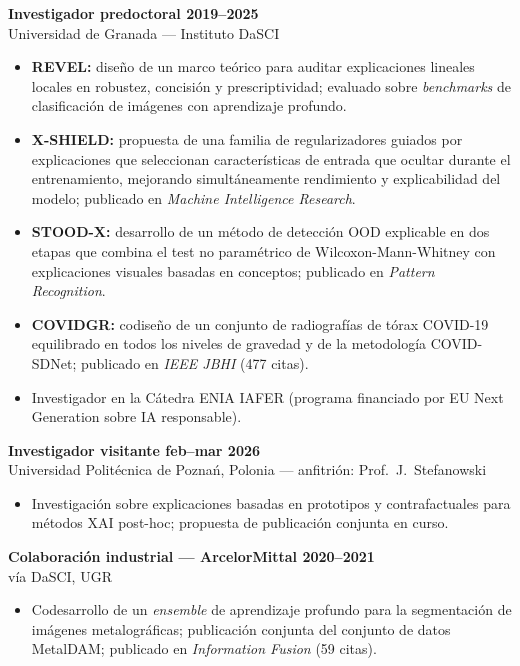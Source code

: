 \documentclass[10pt,a4paper]{article}
\newcommand{\blueitem}[1]{\textcolor{subtitleblue}{\textbf{#1}}}
\newcommand{\sub}[1]{\textcolor{subtle}{\footnotesize #1}}
\begin{document}
\blueitem{Investigador predoctoral \hfill 2019--2025} \\
\sub{Universidad de Granada --- Instituto DaSCI}
\begin{itemize}
    \item \textbf{REVEL:} diseño de un marco teórico para auditar explicaciones lineales locales en robustez, concisión y prescriptividad; evaluado sobre \textit{benchmarks} de clasificación de imágenes con aprendizaje profundo.
    \item \textbf{X-SHIELD:} propuesta de una familia de regularizadores guiados por explicaciones que seleccionan características de entrada que ocultar durante el entrenamiento, mejorando simultáneamente rendimiento y explicabilidad del modelo; publicado en \textit{Machine Intelligence Research}.
    \item \textbf{STOOD-X:} desarrollo de un método de detección OOD explicable en dos etapas que combina el test no paramétrico de Wilcoxon-Mann-Whitney con explicaciones visuales basadas en conceptos; publicado en \textit{Pattern Recognition}.
    \item \textbf{COVIDGR:} codiseño de un conjunto de radiografías de tórax COVID-19 equilibrado en todos los niveles de gravedad y de la metodología COVID-SDNet; publicado en \textit{IEEE JBHI} (477 citas).
    \item Investigador en la Cátedra ENIA IAFER (programa financiado por EU Next Generation sobre IA responsable).
\end{itemize}

\blueitem{Investigador visitante \hfill feb--mar 2026} \\
\sub{Universidad Politécnica de Poznań, Polonia --- anfitrión: Prof.~J.~Stefanowski}
\begin{itemize}
    \item Investigación sobre explicaciones basadas en prototipos y contrafactuales para métodos XAI post-hoc; propuesta de publicación conjunta en curso.
\end{itemize}

\blueitem{Colaboración industrial --- ArcelorMittal \hfill 2020--2021} \\
\sub{vía DaSCI, UGR}
\begin{itemize}
    \item Codesarrollo de un \textit{ensemble} de aprendizaje profundo para la segmentación de imágenes metalográficas; publicación conjunta del conjunto de datos MetalDAM; publicado en \textit{Information Fusion} (59 citas).
\end{itemize}
\end{document}
